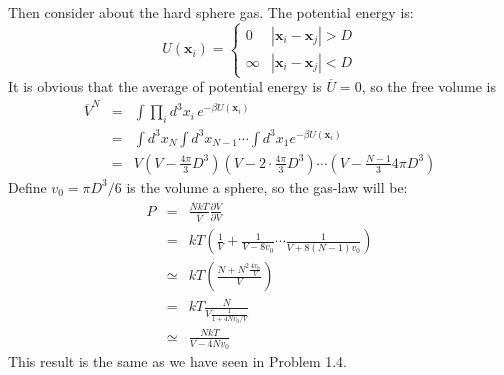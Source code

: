 \documentclass{article}
\begin{document}
Then consider about the hard sphere gas. The potential energy is:
$$
U(\mathbf{x}_i)=\left\{\begin{array}{ll}
0 &|\mathbf{x}_i-\mathbf{x}_j| > D\\
\infty &|\mathbf{x}_i-\mathbf{x}_j| < D
\end{array}\right.
$$
It is obvious that the average of potential energy is $\overline{U} = 0$, so the free volume is
\begin{eqnarray}
\overline{V}^N&=&\int \prod_i d^3x_i\,e^{-\beta U(\mathbf{x}_i)}\nonumber\\
&=&\int d^3x_N\int d^3x_{N-1}\cdots \int d^3x_1 e^{-\beta U(\mathbf{x}_i)}\nonumber\\
&=&V\left(V-\frac{4\pi}{3}D^3\right)\left(V-2\cdot\frac{4\pi}{3}D^3\right)\cdots\left(V-\frac{N-1}{3}4\pi D^3\right)
\end{eqnarray}
Define $v_0 = \pi D^3/6$ is the volume a sphere, so the gas-law will be:
\begin{eqnarray}
P &=& \frac{NkT}{\overline{V}}\frac{\partial \overline{V}}{\partial V}\nonumber\\
&=& kT\left(\frac{1}{V}+\frac{1}{V-8v_0}\cdots \frac{1}{V+8(N-1)v_0}\right)\nonumber\\
&\simeq & kT\left(\frac{N+N^2\frac{4v_0}{V}}{V}\right)\nonumber\\
&=& kT\frac{N}{V\frac{1}{1+4Nv_0/V}}\nonumber\\
&\simeq &\frac{NkT}{V-4Nv_0}
\end{eqnarray}
This result is the same as we have seen in Problem 1.4.
\end{document}
